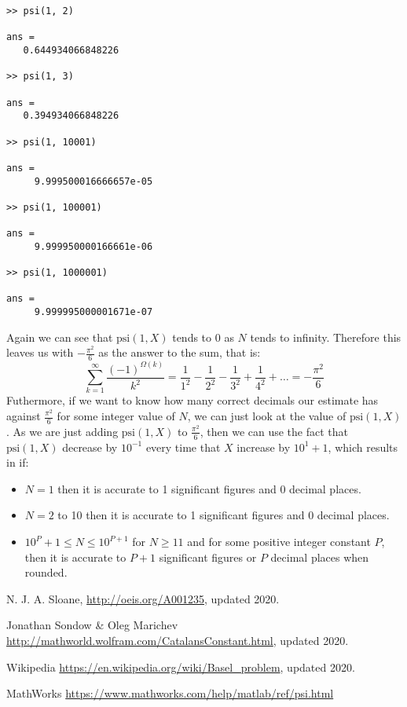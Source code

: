 \documentclass[12pt]{article}
\begin{document}
\begin{lstlisting}[title={Increasing values of X}]
>> psi(1, 2)

ans =
   0.644934066848226

>> psi(1, 3)

ans =
   0.394934066848226

>> psi(1, 10001)

ans =
     9.999500016666657e-05

>> psi(1, 100001)

ans =
     9.999950000166661e-06

>> psi(1, 1000001)

ans =
     9.999995000001671e-07
\end{lstlisting}
Again we can see that $\text{psi}(1, X)$ tends to 0 as $N$ tends to infinity. Therefore this leaves us with $-\frac{\pi^2}{6}$ as the answer to the sum, that is:
\begin{equation*}
\sum^\infty_{k=1} \frac{(-1)^{\Omega(k)}}{k^2} = \frac{1}{1^2}-\frac{1}{2^2}-\frac{1}{3^2}+\frac{1}{4^2}+\ldots = -\frac{\pi^2}{6}
\end{equation*}
Futhermore, if we want to know how many correct decimals our estimate has against $\frac{\pi^2}{6}$ for some integer value of $N$, we can just look at the value of $\text{psi}(1, X)$. As we are just adding $\text{psi}(1, X)$ to $\frac{\pi^2}{6}$, then we can use the fact that $\text{psi}(1, X)$ decrease by $10^{-1}$ every time that $X$ increase by $10^1+1$, which results in if:
\begin{itemize}[label=$-$]
  \item $N=1$ then it is accurate to 1 significant figures and 0 decimal places.
  \item $N=2$ to 10 then it is accurate to 1 significant figures and 0 decimal places.
  \item $10^P+1 \leq N \leq 10^{P+1}$ for $N \geq 11$ and for some positive integer constant $P$, then it is accurate to $P+1$ significant figures or $P$ decimal places when rounded.
\end{itemize}


\begin{thebibliography}{9}
N. J. A. Sloane, \url{http://oeis.org/A001235}, updated 2020.

Jonathan Sondow \& Oleg Marichev  \url{http://mathworld.wolfram.com/CatalansConstant.html}, updated 2020.

Wikipedia \url{https://en.wikipedia.org/wiki/Basel_problem}, updated 2020.

MathWorks \url{https://www.mathworks.com/help/matlab/ref/psi.html}

\end{thebibliography}
\end{document}

